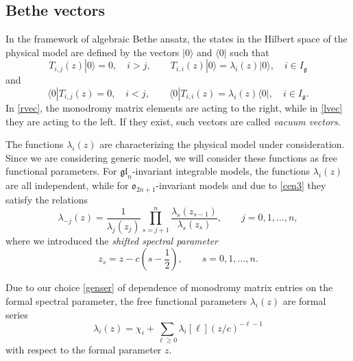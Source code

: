 \documentclass[10pt,a4paper]{amsart}
\theoremstyle{definition}
\def\r#1{\eqref{#1}}
\def\Ig{I_{\mathfrak{g}}}
\def\rvec{|0\rangle}
\def\lvec{\langle0|}
\def\vk{\chi}
\begin{document}
\subsection{Bethe vectors}

In the framework of algebraic Bethe ansatz, the states in the
Hilbert space of the physical model are defined by the vectors $\rvec$ and $\lvec$
such that
\begin{equation}\label{rvec}
T_{i,j}(z)\rvec =0 ,\quad i>j ,\qquad T_{i,i}(z)\rvec=\lambda_i(z)\rvec ,\quad i\in\Ig
\end{equation}
and
\begin{equation}\label{lvec}
\lvec T_{i,j}(z) =0 ,\quad i<j ,\qquad \lvec T_{i,i}(z)=\lambda_i(z)\lvec ,\quad i\in\Ig .
\end{equation}
In \r{rvec}, the monodromy matrix elements are acting to the right, while in \r{lvec}
they are acting to the left. If they exist, such vectors are called {\it vacuum vectors}.

The functions $\lambda_i(z)$ are characterizing the physical model under
consideration. Since we are
considering generic model, we will consider these functions as free functional
parameters. For $\mathfrak{gl}_n$-invariant
integrable models, the functions $\lambda_i(z)$ are all independent, while for
$\mathfrak{o}_{2n+1}$-invariant models and due to \r{cen3}
they satisfy the relations \cite{LP1}
\begin{equation}\label{lam}
\lambda_{-j}(z)=\frac{1}{\lambda_{j}(z_j)}\prod_{s=j+1}^n\frac{\lambda_s(z_{s-1})}{\lambda_s(z_s)},\qquad j=0,1,\dots,n ,
\end{equation}
where we introduced the \textit{shifted spectral parameter}
\begin{equation}\label{zs}
z_s=z-c\left(s-\frac12\right),\qquad s=0,1,\dots,n .
\end{equation}

Due to our choice \r{genser} of dependence of monodromy matrix entries
on the formal spectral parameter, the free functional parameters $\lambda_i(z)$
are formal series
\[%
\lambda_i(z)=\vk_i+\sum_{\ell\geq 0}\lambda_i[\ell] (z/c)^{-\ell-1}
\]
with respect to the formal parameter $z$.
\end{document}

